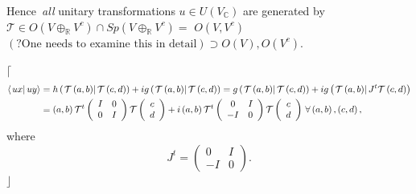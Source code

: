 \documentclass[aps,preprint]{revtex4}
\begin{document}
Hence\emph{\ all }unitary transformations $u\in U\left( V_{\mathbb{C}%
}\right) $ are generated by $\mathcal{T}\in O\left( V\oplus_{\mathbb{R}%
}V^{c}\right) \cap Sp\left( V\oplus_{\mathbb{R}}V^{c}\right) =$ $O\left(
V,V^{c}\right) $ $\left( ?\text{One needs to examine this in detail}\right)
\supset O\left( V\right) ,O\left( V^{c}\right) .$

$\lceil$%
\begin{align}
\left\langle \left. ux\right\vert uy\right\rangle & =h\left( \left. \mathcal{%
T}\left( a,b\right) \right\vert \mathcal{T}\left( c,d\right) \right)
+ig\left( \left. \mathcal{T}\left( a,b\right) \right\vert \mathcal{T}\left(
c,d\right) \right) =g\left( \left. \mathcal{T}\left( a,b\right) \right\vert 
\mathcal{T}\left( c,d\right) \right) +ig\left( \left. \mathcal{T}\left(
a,b\right) \right\vert J^{t}\mathcal{T}\left( c,d\right) \right) \\
& =\left( a,b\right) \mathcal{T}^{t}\left( 
\begin{array}{cc}
I & 0 \\ 
0 & I%
\end{array}
\right) \mathcal{T}\left( 
\begin{array}{c}
c \\ 
d%
\end{array}
\right) +i\left( a,b\right) \mathcal{T}^{t}\left( 
\begin{array}{cc}
0 & I \\ 
-I & 0%
\end{array}
\right) \mathcal{T}\left( 
\begin{array}{c}
c \\ 
d%
\end{array}
\right) \,\forall\left( a,b\right) ,\left( c,d\right) ,
\end{align}
where 
\begin{equation}
J^{t}=\left( 
\begin{array}{cc}
0 & I \\ 
-I & 0%
\end{array}
\right) .
\end{equation}
$\rfloor$
\end{document}
